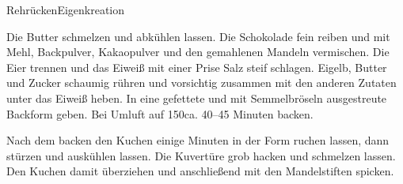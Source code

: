 \begin{recipe}{Rehrücken}{Eigenkreation}\label{Rehruecken}
  \inglist

  \steps

  Die Butter schmelzen und abkühlen lassen. Die Schokolade fein reiben und
  mit Mehl, Backpulver, Kakaopulver und den gemahlenen Mandeln vermischen.
  Die Eier trennen und das Eiweiß mit einer Prise Salz steif schlagen.
  Eigelb, Butter und Zucker schaumig rühren und vorsichtig zusammen mit den
  anderen Zutaten unter das Eiweiß heben. In eine gefettete und mit
  Semmelbröseln ausgestreute Backform geben. Bei Umluft auf 150\celsius ca.
  40--45 Minuten backen.
  
  Nach dem backen den Kuchen einige Minuten in der Form ruchen lassen, dann
  stürzen und auskühlen lassen. Die Kuvertüre grob hacken und schmelzen
  lassen. Den Kuchen damit überziehen und anschließend mit den Mandelstiften
  spicken.
  
\end{recipe}
